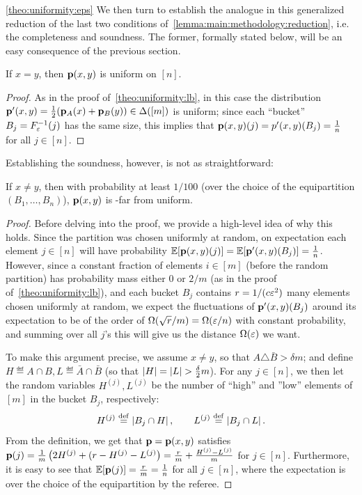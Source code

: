 \begin{proofof}{\cref{theo:uniformity:eps}}
We then turn to establish the analogue in this generalized reduction of the last two conditions of~\cref{lemma:main:methodology:reduction}, i.e. the completeness and soundness. The former, formally stated below, will be an easy consequence of the previous section.
\begin{claim}\label{claim:eps:uniformity:completeness}
If $x=y$, then $\mathbf{p}(x,y)$ is uniform on $[n]$.
\end{claim}
\begin{proof}
As in the proof of~\cref{theo:uniformity:lb}, in this case the distribution $\mathbf{p}'(x,y) = \frac{1}{2}(\mathbf{p}_A(x)+\mathbf{p}_B(y))\in\Delta\!\left([m]\right)$ is uniform; since each ``bucket'' $B_j=F_\varepsilon^{-1}(j)$ has the same size, this implies that $\mathbf{p}(x,y)(j) = p'(x,y)( B_j ) = \frac{1}{n}$ for all $j\in[n]$.
\end{proof}

\noindent Establishing the soundness, however, is not as straightforward:
\begin{claim}\label{claim:eps:uniformity:soundness}
If $x\neq y$, then with probability at least $1/100$ (over the choice of the equipartition $(B_1,\dots, B_n)$), $\mathbf{p}(x,y)$ is \eps-far from uniform.
\end{claim}
\begin{proof}
Before delving into the proof, we provide a high-level idea of why this holds. Since the partition was chosen uniformly at random, on expectation each element $j\in[n]$ will have probability $\mathbb{E}\!\left[\mathbf{p}(x,y)(j)\right] = \mathbb{E}\!\left[\mathbf{p}'(x,y)( B_j )\right] = \frac{1}{n}$. However, since a constant fraction of elements $i\in[m]$ (before the random partition) has probability mass either $0$ or $2/m$ (as in the proof of~\cref{theo:uniformity:lb}), and each bucket $B_j$ contains $r=1/(c\varepsilon^2)$ many elements chosen uniformly at random, we expect the fluctuations of $\mathbf{p}'(x,y)( B_j )$ around its expectation to be of the order of $\bigOmega{\sqrt{r}/m} = \bigOmega{\eps/n}$ with constant probability, and summing over all $j$'s this will give us the distance $\bigOmega{\eps}$ we want.

To make this argument precise, we assume $x\neq y$, so that $A\triangle \bar{B} > \delta m$; and define $H\eqdef A\cap B,L\eqdef\bar{A}\cap \bar{B}$ (so that $\left\lvert H \right\rvert=\left\lvert L \right\rvert > \frac{\delta}{2}m$). For any $j\in[n]$, we then let the random variables $H^{(j)}, L^{(j)}$ be the number of ``high'' and ''low'' elements of $[m]$ in the bucket $B_j$, respectively:
\[
H^{(j)} \stackrel{\rm def}{=} \left\lvert B_j\cap H \right\rvert, \qquad L^{(j)} \stackrel{\rm def}{=} \left\lvert B_j\cap L \right\rvert.
\]
From the definition, we get that $\mathbf{p}=\mathbf{p}(x,y)$ satisfies $\mathbf{p}(j) = \frac{1}{m}\left(2H^{(j)} + (r - H^{(j)} - L^{(j)}\right) = \frac{r}{m} + \frac{H^{(j)} - L^{(j)}}{m}$ for $j\in[n]$. Furthermore, it is easy to see that $\mathbb{E}\!\left[\mathbf{p}(j)\right] = \frac{r}{m} = \frac{1}{n}$ for all $j\in[n]$, where the expectation is over the choice of the equipartition by the referee.


\end{proof}
\end{proofof}

